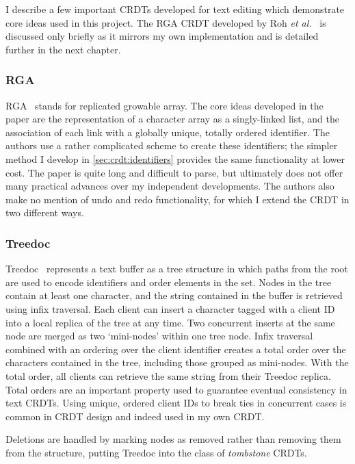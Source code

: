 \documentclass[12pt,a4paper,twoside,openright]{report}
\begin{document}
		I describe a few important CRDTs developed for text editing which demonstrate core ideas used in this project. The RGA CRDT developed by Roh \textit{et al.}~\cite{roh2011replicated} is discussed only briefly as it mirrors my own implementation and is detailed further in the next chapter.
		
		\subsubsection{RGA}	\label{sec:rga}
		RGA~\cite{roh2011replicated} stands for replicated growable array. The core ideas developed in the paper are the representation of a character array as a singly-linked list, and the association of each link with a globally unique, totally ordered identifier. The authors use a rather complicated scheme to create these identifiers; the simpler method I develop in \cref{sec:crdt:identifiers} provides the same functionality at lower cost. The paper is quite long and difficult to parse, but ultimately does not offer many practical advances over my independent developments. The authors also make no mention of undo and redo functionality, for which I extend the CRDT in two different ways.
		
		\subsubsection{Treedoc}
		
		Treedoc~\cite{preguica2009} represents a text buffer as a tree structure in which paths from the root are used to encode identifiers and order elements in the set. Nodes in the tree contain at least one character, and the string contained in the buffer is retrieved using infix traversal. Each client can insert a character tagged with a client ID into a local replica of the tree at any time. Two concurrent inserts at the same node are merged as two `mini-nodes' within one tree node. Infix traversal combined with an ordering over the client identifier creates a total order over the characters contained in the tree, including those grouped as mini-nodes. With the total order, all clients can retrieve the same string from their Treedoc replica. Total orders are an important property used to guarantee eventual consistency in text CRDTs. Using unique, ordered client IDs to break ties in concurrent cases is common in CRDT design and indeed used in my own CRDT.
		
		Deletions are handled by marking nodes as removed rather than removing them from the structure, putting Treedoc into the class of \textit{tombstone} CRDTs.
		
\end{document}
